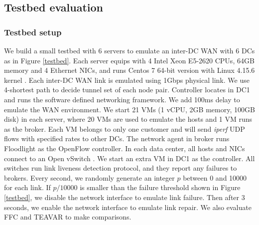 \documentclass[sigconf]{acmart}
\begin{document}
\subsection{Testbed evaluation}\label{testbed-evaluation}
\subsubsection{Testbed setup}
We build a small testbed with 6 servers to emulate an inter-DC WAN with 6 DCs as in Figure \ref{testbed}.
Each server equips with 4 Intel Xeon E5-2620 CPUs, 64GB memory and 4 Ethernet NICs, and runs Centos 7 64-bit version with Linux 4.15.6 kernel \cite{Kermel}.
Each inter-DC WAN link is emulated using 1Gbps physical link.
We use 4-shortest path to decide tunnel set of each node pair.
Controller locates in DC1 and runs the software defined networking framework.
We add 100ms delay to emulate the WAN environment.
We start 21 VMs (1 vCPU, 2GB memory, 100GB disk) in each server, where 20 VMs are used to emulate the hosts and 1 VM runs as the broker.
Each VM belongs to only one customer and will send  \textit{iperf} UDP flows with specified rates to other DCs.
The network agent in broker runs Floodlight \cite{floodlight} as the OpenFlow controller.
In each data center, all hosts and  NICs connect to an Open vSwitch \cite{openvswitch}.
We start an extra VM in DC1 as the controller. 
All switches run link liveness detection protocol, and they report any failures to brokers.
Every second, we randomly generate an integer $p$ between 0 and 10000 for each link.
If  $p/10000$ is smaller than the failure threshold shown in Figure \ref{testbed}, we disable the network interface to emulate link failure.
Then after 3 seconds, we enable the network interface to emulate link repair.
We also evaluate FFC \cite{FFC} and TEAVAR \cite{Teavar} to make comparisons.
\end{document}
